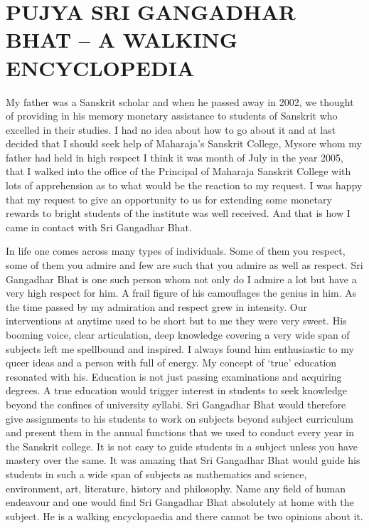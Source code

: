 \chapter{PUJYA SRI GANGADHAR BHAT – A WALKING ENCYCLOPEDIA}

\begin{center}
\smallskip

\end{center}
My father was a Sanskrit scholar and when he passed away in 2002, we thought of providing in his memory monetary assistance to students of Sanskrit who excelled in their studies. I had no idea about how to go about it and at last decided that I should seek help of Maharaja’s Sanskrit College, Mysore whom my father had held in high respect I think it was month of July in the year 2005, that I walked into the office of the Principal of Maharaja Sanskrit College with lots of apprehension as to what would be the reaction to my request. I was happy that my request to give an opportunity to us for extending some monetary rewards to bright students of the institute was well received. And that is how I came in contact with Sri Gangadhar Bhat.

In life one comes across many types of individuals. Some of them you respect, some of them you admire and few are such that you admire as well as respect. Sri Gangadhar Bhat is one such person whom not only do I admire a lot but have a very high respect for him. A frail figure of his camouflages the genius in him. As the time passed by my admiration and respect grew in intensity. Our interventions at anytime used to be short but to me they were very sweet. His booming voice, clear articulation, deep knowledge covering a very wide span of subjects left me spellbound and inspired. I always found him enthusiastic to my queer ideas and a person with full of energy. My concept of ‘true’ education resonated with his. Education is not just passing examinations and acquiring degrees. A true education would trigger interest in students to seek knowledge beyond the confines of university syllabi. Sri Gangadhar Bhat would therefore give assignments to his students to work on subjects beyond subject curriculum and present them in the annual functions that we used to conduct every year in the Sanskrit college. It is not easy to guide students in a subject unless you have mastery over the same. It was amazing that Sri Gangadhar Bhat would guide his students in such a wide span of subjects as mathematics and science, environment, art, literature, history and philosophy. Name any field of human endeavour and one would find Sri Gangadhar Bhat absolutely at home with the subject. He is a walking encyclopaedia and there cannot be two opinions about it. 	

